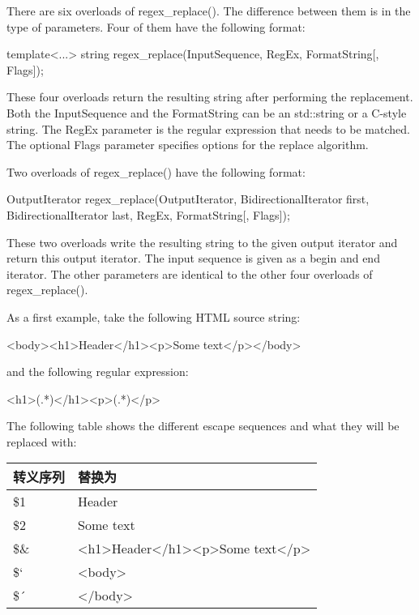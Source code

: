 There are six overloads of regex\_replace(). The difference between them is in the type of parameters. Four of them have the following format:

\begin{cpp}
template<...>
string regex_replace(InputSequence, RegEx, FormatString[, Flags]);
\end{cpp}

These four overloads return the resulting string after performing the replacement. Both the InputSequence and the FormatString can be an std::string or a C-style string. The RegEx parameter is the regular expression that needs to be matched. The optional Flags parameter specifies options for the replace algorithm.

Two overloads of regex\_replace() have the following format:

\begin{cpp}
OutputIterator regex_replace(OutputIterator,
                             BidirectionalIterator first,
                             BidirectionalIterator last,
                             RegEx, FormatString[, Flags]);
\end{cpp}

These two overloads write the resulting string to the given output iterator and return this output iterator. The input sequence is given as a begin and end iterator. The other parameters are identical to the other four overloads of regex\_replace().


As a first example, take the following HTML source string:

\begin{shell}
<body><h1>Header</h1><p>Some text</p></body>
\end{shell}

and the following regular expression:

\begin{cpp}
<h1>(.*)</h1><p>(.*)</p>
\end{cpp}

The following table shows the different escape sequences and what they will be replaced with:

\begin{longtable}{|l|l|}
\hline
\textbf{转义序列} & \textbf{替换为}         \\ \hline
\endfirsthead
%
\endhead
%
\$1                      & Header                         \\ \hline
\$2                      & Some text                      \\ \hline
\$\& & \textless{}h1\textgreater{}Header\textless{}/h1\textgreater{}\textless{}p\textgreater{}Some text\textless{}/p\textgreater{} \\ \hline
\$`                      & \textless{}body\textgreater{}  \\ \hline
\$´                      & \textless{}/body\textgreater{} \\ \hline
\end{longtable}

